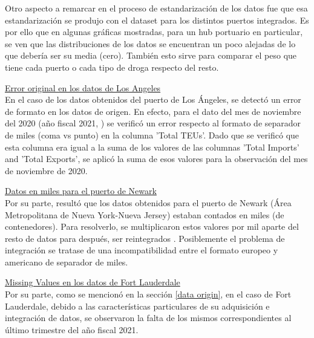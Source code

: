 \documentclass[12pt]{article}
\begin{document}
		Otro aspecto a remarcar en el proceso de estandarización de los datos fue que esa estandarización se produjo con el dataset para los distintos puertos integrados. Es por ello que en algunas gráficas mostradas, para un hub portuario en particular, se ven que las distribuciones de los datos se encuentran un poco alejadas de lo que debería ser su media (cero). También esto sirve para comparar el peso que tiene cada puerto o cada tipo de droga respecto del resto.
		
		\underline{Error original en los datos de Los Angeles}\\
		En el caso de los datos obtenidos del puerto de Los Ángeles, se detectó un error de formato en los datos de origen. En efecto, para el dato del mes de noviembre del 2020 (año fiscal 2021, \cite{portla2025containerstats}) se verificó un error respecto al formato de separador de miles (coma vs punto) en la columna 'Total TEUs'. Dado que se verificó que esta columna era igual a la suma de los valores de las columnas 'Total Imports' and 'Total Exports', se aplicó la suma de esos valores para la observación del mes de noviembre de 2020.
		
		\underline{Datos en miles para el puerto de Newark}\\
		Por su parte, resultó que los datos obtenidos para el puerto de Newark (Área Metropolitana de Nueva York-Nueva Jersey) estaban contados en miles (de contenedores). Para resolverlo, se multiplicaron estos valores por mil aparte del resto de datos para después, ser reintegrados \cite{panynj2025facts}. Posiblemente el problema de integración se tratase de una incompatibilidad entre el formato europeo y americano de separador de miles.
		
		\underline{Missing Values en los datos de Fort Lauderdale}\\
		Por su parte, como se mencionó en la sección \ref{data origin}, en el caso de Fort Lauderdale, debido a las características particulares de su adquisición e integración de datos, se observaron la falta de los mismos correspondientes al último trimestre del año fiscal 2021.
		
		
\end{document}
